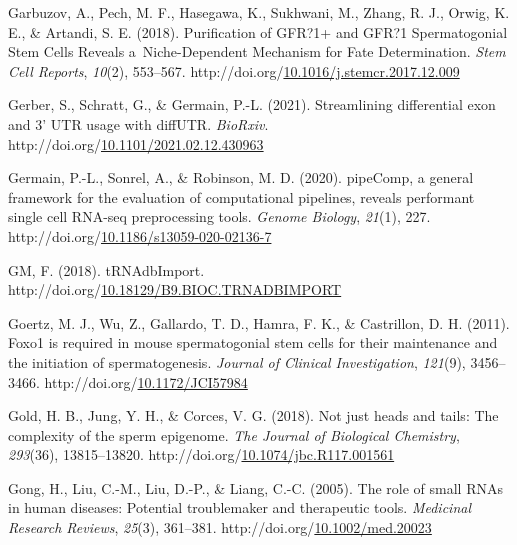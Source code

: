 \documentclass[12pt,twoside]{reedthesis}
\newlength{\cslhangindent}
\newenvironment{CSLReferences}[2] %
 {%
  \setlength{\parindent}{0pt}
  \ifodd #1 \everypar{\setlength{\hangindent}{\cslhangindent}}\ignorespaces\fi
  \ifnum #2 > 0
  \setlength{\parskip}{#2\baselineskip}
  \fi
 }%
 {}
\begin{document}
\begin{CSLReferences}{1}{0}
\leavevmode{}%
Garbuzov, A., Pech, M. F., Hasegawa, K., Sukhwani, M., Zhang, R. J., Orwig, K. E., \& Artandi, S. E. (2018). Purification of GFR?1+ and GFR?1{\textendash} Spermatogonial Stem Cells Reveals a~Niche-Dependent Mechanism for Fate Determination. \emph{Stem Cell Reports}, \emph{10}(2), 553--567. http://doi.org/\href{https://doi.org/10.1016/j.stemcr.2017.12.009}{10.1016/j.stemcr.2017.12.009}

\leavevmode{}%
Gerber, S., Schratt, G., \& Germain, P.-L. (2021). Streamlining differential exon and 3' UTR usage with diffUTR. \emph{BioRxiv}. http://doi.org/\href{https://doi.org/10.1101/2021.02.12.430963}{10.1101/2021.02.12.430963}

\leavevmode{}%
Germain, P.-L., Sonrel, A., \& Robinson, M. D. (2020). pipeComp, a general framework for the evaluation of computational pipelines, reveals performant single cell RNA-seq preprocessing tools. \emph{Genome Biology}, \emph{21}(1), 227. http://doi.org/\href{https://doi.org/10.1186/s13059-020-02136-7}{10.1186/s13059-020-02136-7}

\leavevmode{}%
GM, F. (2018). tRNAdbImport. http://doi.org/\href{https://doi.org/10.18129/B9.BIOC.TRNADBIMPORT}{10.18129/B9.BIOC.TRNADBIMPORT}

\leavevmode{}%
Goertz, M. J., Wu, Z., Gallardo, T. D., Hamra, F. K., \& Castrillon, D. H. (2011). Foxo1 is required in mouse spermatogonial stem cells for their maintenance and the initiation of spermatogenesis. \emph{Journal of Clinical Investigation}, \emph{121}(9), 3456--3466. http://doi.org/\href{https://doi.org/10.1172/JCI57984}{10.1172/JCI57984}

\leavevmode{}%
Gold, H. B., Jung, Y. H., \& Corces, V. G. (2018). Not just heads and tails: The complexity of the sperm epigenome. \emph{The Journal of Biological Chemistry}, \emph{293}(36), 13815--13820. http://doi.org/\href{https://doi.org/10.1074/jbc.R117.001561}{10.1074/jbc.R117.001561}

\leavevmode{}%
Gong, H., Liu, C.-M., Liu, D.-P., \& Liang, C.-C. (2005). The role of small RNAs in human diseases: Potential troublemaker and therapeutic tools. \emph{Medicinal Research Reviews}, \emph{25}(3), 361--381. http://doi.org/\href{https://doi.org/10.1002/med.20023}{10.1002/med.20023}


\end{CSLReferences}
\end{document}
